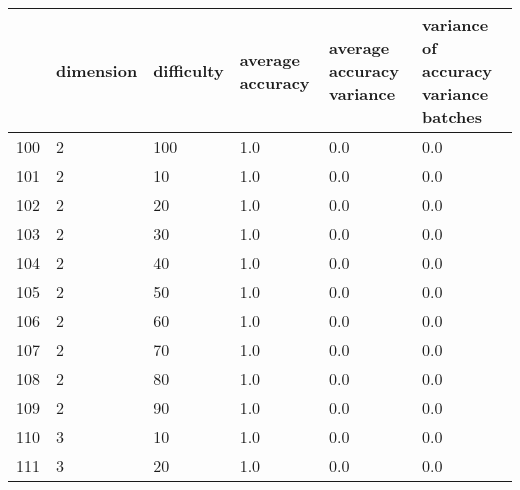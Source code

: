 \documentclass{article}
\begin{document}
\begin{center}
\begin{tabular}{llllll}
\toprule
{} & dimension & difficulty & average accuracy & average accuracy variance & variance of accuracy variance batches \\
\midrule
100 &         2 &        100 &              1.0 &                       0.0 &                                   0.0 \\
101 &         2 &         10 &              1.0 &                       0.0 &                                   0.0 \\
102 &         2 &         20 &              1.0 &                       0.0 &                                   0.0 \\
103 &         2 &         30 &              1.0 &                       0.0 &                                   0.0 \\
104 &         2 &         40 &              1.0 &                       0.0 &                                   0.0 \\
105 &         2 &         50 &              1.0 &                       0.0 &                                   0.0 \\
106 &         2 &         60 &              1.0 &                       0.0 &                                   0.0 \\
107 &         2 &         70 &              1.0 &                       0.0 &                                   0.0 \\
108 &         2 &         80 &              1.0 &                       0.0 &                                   0.0 \\
109 &         2 &         90 &              1.0 &                       0.0 &                                   0.0 \\
110 &         3 &         10 &              1.0 &                       0.0 &                                   0.0 \\
111 &         3 &         20 &              1.0 &                       0.0 &                                   0.0 \\
\bottomrule
\end{tabular}
\end{center}
\newpage
\end{document}
